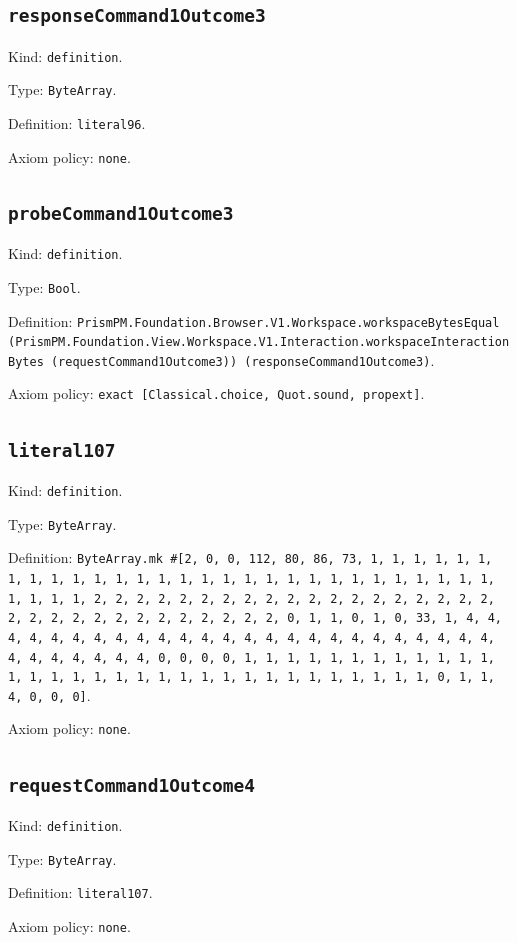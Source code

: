 \documentclass[11pt]{article}
\begin{document}
\subsection*{\texttt{responseCommand1Outcome3}}
\noindent Kind: \texttt{definition}.\par
\noindent Type: \texttt{ByteArray}.\par
\noindent Definition: \texttt{literal96}.\par
\noindent Axiom policy: \texttt{none}.\par
\subsection*{\texttt{probeCommand1Outcome3}}
\noindent Kind: \texttt{definition}.\par
\noindent Type: \texttt{Bool}.\par
\noindent Definition: \texttt{PrismPM.Foundation.Browser.V1.Workspace.workspaceBytesEqual (PrismPM.Foundation.View.Workspace.V1.Interaction.workspaceInteractionBytes (requestCommand1Outcome3)) (responseCommand1Outcome3)}.\par
\noindent Axiom policy: \texttt{exact [Classical.choice, Quot.sound, propext]}.\par
\subsection*{\texttt{literal107}}
\noindent Kind: \texttt{definition}.\par
\noindent Type: \texttt{ByteArray}.\par
\noindent Definition: \texttt{ByteArray.mk \#[2, 0, 0, 112, 80, 86, 73, 1, 1, 1, 1, 1, 1, 1, 1, 1, 1, 1, 1, 1, 1, 1, 1, 1, 1, 1, 1, 1, 1, 1, 1, 1, 1, 1, 1, 1, 1, 1, 1, 1, 2, 2, 2, 2, 2, 2, 2, 2, 2, 2, 2, 2, 2, 2, 2, 2, 2, 2, 2, 2, 2, 2, 2, 2, 2, 2, 2, 2, 2, 2, 2, 2, 0, 1, 1, 0, 1, 0, 33, 1, 4, 4, 4, 4, 4, 4, 4, 4, 4, 4, 4, 4, 4, 4, 4, 4, 4, 4, 4, 4, 4, 4, 4, 4, 4, 4, 4, 4, 4, 4, 4, 4, 0, 0, 0, 0, 1, 1, 1, 1, 1, 1, 1, 1, 1, 1, 1, 1, 1, 1, 1, 1, 1, 1, 1, 1, 1, 1, 1, 1, 1, 1, 1, 1, 1, 1, 1, 1, 0, 1, 1, 4, 0, 0, 0]}.\par
\noindent Axiom policy: \texttt{none}.\par
\subsection*{\texttt{requestCommand1Outcome4}}
\noindent Kind: \texttt{definition}.\par
\noindent Type: \texttt{ByteArray}.\par
\noindent Definition: \texttt{literal107}.\par
\noindent Axiom policy: \texttt{none}.\par
\end{document}
